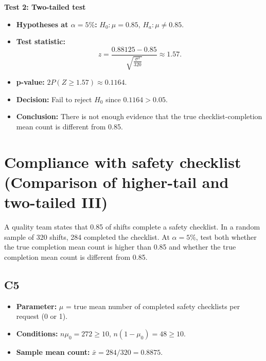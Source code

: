 
\textbf{Test 2: Two-tailed test}

\begin{itemize}
	\item \textbf{Hypotheses at \(\alpha=5\%\):} \(H_0\colon \mu=0.85\), \(H_a\colon \mu\ne0.85\).
	\item \textbf{Test statistic:}
	\[
	z=\frac{0.88125-0.85}{\sqrt{\frac{\sigma^2}{320}}}\approx 1.57.
	\]
	\item \textbf{p-value:} \(2P(Z\ge 1.57)\approx 0.1164\).
	\item \textbf{Decision:} Fail to reject \(H_0\) since \(0.1164>0.05\).
	\item \textbf{Conclusion:} There is not enough evidence that the true checklist-completion mean count is different from 0.85.
\end{itemize}

\begin{center}
\end{center}


\section{Compliance with safety checklist (Comparison of higher-tail and two-tailed III)}
A quality team states that 0.85 of shifts complete a safety checklist. In a random sample of 320 shifts, 284 completed the checklist. At \(\alpha=5\%\), test both whether the true completion mean count is higher than 0.85 and whether the true completion mean count is different from 0.85.

\subsection*{C5}
\begin{itemize}
	\item \textbf{Parameter:} \(\mu\) = true mean number of completed safety checklists per request (0 or 1).
	\item \textbf{Conditions:} \(n\mu_0=272\ge10\), \(n(1-\mu_0)=48\ge10\).
	\item \textbf{Sample mean count:} \(\bar x=284/320=0.8875\).
\end{itemize}

